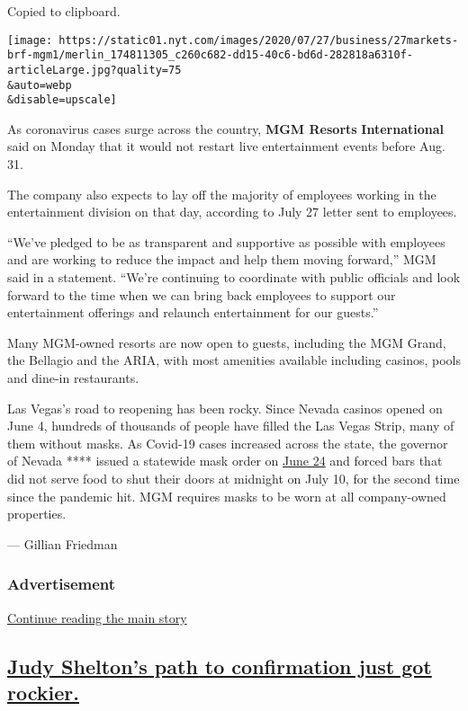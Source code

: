 Copied to clipboard.

\texttt{[image: https://static01.nyt.com/images/2020/07/27/business/27markets-brf-mgm1/merlin\_174811305\_c260c682-dd15-40c6-bd6d-282818a6310f-articleLarge.jpg?quality=75\\\&auto=webp\\\&disable=upscale]}

As coronavirus cases surge across the country, \textbf{MGM Resorts}
\textbf{International} said on Monday that it would not restart live
entertainment events before Aug. 31.

The company also expects to lay off the majority of employees working in
the entertainment division on that day, according to July 27 letter sent
to employees.

``We've pledged to be as transparent and supportive as possible with
employees and are working to reduce the impact and help them moving
forward,'' MGM said in a statement. ``We're continuing to coordinate
with public officials and look forward to the time when we can bring
back employees to support our entertainment offerings and relaunch
entertainment for our guests.''

Many MGM-owned resorts are now open to guests, including the MGM Grand,
the Bellagio and the ARIA, with most amenities available including
casinos, pools and dine-in restaurants.

Las Vegas's road to reopening has been rocky. Since Nevada casinos
opened on June 4, hundreds of thousands of people have filled the Las
Vegas Strip, many of them without masks. As Covid-19 cases increased
across the state, the governor of Nevada **** issued a statewide mask
order on
\href{http://gov.nv.gov/News/Press/2020/Gov__Sisolak_announces_mandatory_face_covering_policy_in_public/}{June
24} and forced bars that did not serve food to shut their doors at
midnight on July 10, for the second time since the pandemic hit. MGM
requires masks to be worn at all company-owned properties.

--- Gillian Friedman

\hypertarget{advertisement}{%
\subsubsection{Advertisement}\label{advertisement}}

\protect\hyperlink{after-dfp-ad-mid1}{Continue reading the main story}

\hypertarget{judy-sheltons-path-to-confirmation-just-got-rockier}{%
\subsection{\texorpdfstring{\protect\hyperlink{judy-sheltons-path-to-confirmation-just-got-rockier}{Judy
Shelton's path to confirmation just got
rockier.}}{Judy Shelton's path to confirmation just got rockier.}}\label{judy-sheltons-path-to-confirmation-just-got-rockier}}

